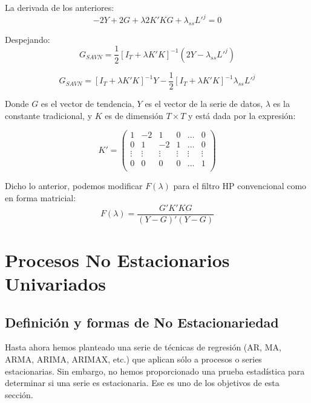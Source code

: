 \documentclass[
]{book}
\begin{document}
La derivada de los anteriores:
\begin{equation}
  -2 Y + 2 G + \lambda 2 K' K G + \lambda_{ss} L'^j = 0
\end{equation}

Despejando:
\begin{equation}
  G_{SAVN} = \frac{1}{2} [I_T + \lambda K' K]^{-1} (2 Y - \lambda_{ss} L'^j)
\end{equation}

\begin{equation}
  G_{SAVN} = [I_T + \lambda K' K]^{-1} Y - \frac{1}{2} [I_T + \lambda K' K]^{-1} \lambda_{ss} L'^j
\end{equation}

Donde \(G\) es el vector de tendencia, \(Y\) es el vector de la serie de datos, \(\lambda\) es la constante tradicional, y \(K\) es de dimensión \(T \times T\) y está dada por la expresión:

\begin{equation}
  K' =
  \begin{pmatrix}
  1 & -2 & 1 & 0 & \ldots & 0 \\
  0 & 1 & -2 & 1 & \ldots & 0 \\
  \vdots & \vdots &  \vdots &  \vdots &  \vdots &  \vdots \\
  0 & 0 & 0 & 0 & \ldots & 1 \\
  \end{pmatrix}
\end{equation}

Dicho lo anterior, podemos modificar \(F(\lambda)\) para el filtro HP convencional como en forma matricial:
\begin{equation}
  F(\lambda) = \frac{G' K' K G}{(Y - G)'(Y - G)}
\end{equation}

\hypertarget{procesos-no-estacionarios-univariados}{%
\chapter{Procesos No Estacionarios Univariados}\label{procesos-no-estacionarios-univariados}}

\hypertarget{definiciuxf3n-y-formas-de-no-estacionariedad}{%
\section{Definición y formas de No Estacionariedad}\label{definiciuxf3n-y-formas-de-no-estacionariedad}}

Hasta ahora hemos planteado una serie de técnicas de regresión (AR, MA, ARMA, ARIMA, ARIMAX, etc.) que aplican sólo a procesos o series estacionarias. Sin embargo, no hemos proporcionado una prueba estadística para determinar si una serie es estacionaria. Ese es uno de los objetivos de esta sección.
\end{document}
